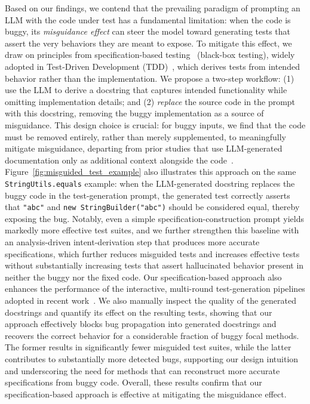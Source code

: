 \documentclass[acmsmall]{acmart}
\begin{document}
Based on our findings, we contend that the prevailing paradigm of prompting an LLM with the code under test has a fundamental limitation: when the code is buggy, its \emph{misguidance effect} can steer the model toward generating tests that assert the very behaviors they are meant to expose. To mitigate this effect, we draw on principles from specification-based testing~\cite{Specification-Base-Testing} (black-box testing), widely adopted in Test-Driven Development (TDD)~\cite{beck2022test-driven-dev}, which derives tests from intended behavior rather than the implementation. We propose a two-step workflow: (1) use the LLM to derive a docstring that captures intended functionality while omitting implementation details; and (2) \emph{replace} the source code in the prompt with this docstring, removing the buggy implementation as a source of misguidance. This design choice is crucial: for buggy inputs, we find that the code must be removed entirely, rather than merely supplemented, to meaningfully mitigate misguidance, departing from prior studies that use LLM-generated documentation only as additional context alongside the code~\cite{EvalImprChatgptUTGenFSE2024}. Figure~\ref{fig:misguided_test_example} also illustrates this approach on the same \texttt{StringUtils.equals} example: when the LLM-generated docstring replaces the buggy code in the test-generation prompt, the generated test correctly asserts that \texttt{"abc"} and \texttt{new StringBuilder("abc")} should be considered equal, thereby exposing the bug. Notably, even a simple specification-construction prompt yields markedly more effective test suites, and we further strengthen this baseline with an analysis-driven intent-derivation step that produces more accurate specifications, which further reduces misguided tests and increases effective tests without substantially increasing tests that assert hallucinated behavior present in neither the buggy nor the fixed code. Our specification-based approach also enhances the performance of the interactive, multi-round test-generation pipelines adopted in recent work~\cite{ChatUniTestFSE2024Demo, EvalImprChatgptUTGenFSE2024, testforge_multi_round}. We also manually inspect the quality of the generated docstrings and quantify its effect on the resulting tests, showing that our approach effectively blocks bug propagation into generated docstrings and recovers the correct behavior for a considerable fraction of buggy focal methods. The former results in significantly fewer misguided test suites, while the latter contributes to substantially more detected bugs, supporting our design intuition and underscoring the need for methods that can reconstruct more accurate specifications from buggy code. Overall, these results confirm that our specification-based approach is effective at mitigating the misguidance effect.
\end{document}
